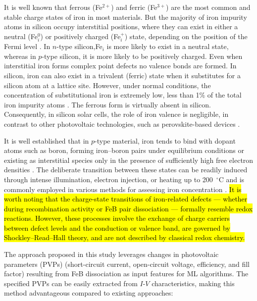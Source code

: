 \documentclass[a4paper,fleqn,draft]{cas-sc}
\begin{document}
\begin{tcolorbox}
\textcolor[rgb]{1.00,0.07,0.00}{
It is well known that ferrous (Fe$^{2+}$) and ferric (Fe$^{3+}$) are the most common and stable charge states of iron in most materials.
But the majority of iron impurity atoms in silicon occupy interstitial positions,
where they can exist in either a neutral (Fe$_i^0$) or positively charged (Fe$_i^+$) state,
depending on the position of the Fermi level \cite{Macdonald2004,Istratov1999}.
In $n$-type silicon,Fe$_i$ is more likely to exist in a neutral state,
whereas in $p$-type silicon, it is more likely to be positively charged.
Even when interstitial iron forms complex point defects no valence bonds are formed.
In silicon, iron can also exist in a trivalent (ferric) state when it substitutes for a silicon atom at a lattice site.
However, under normal conditions, the concentration of substitutional iron is extremely low, less than 1\% of the total iron impurity atoms \cite{Wright2016}.
The ferrous form is virtually absent in silicon.
Consequently, in silicon solar cells, the role of iron valence is negligible,
in contrast to other photovoltaic technologies, such as perovskite-based devices \cite{Poindexter2017}.}%
\end{tcolorbox}

It is well established that in $p$-type material,
iron tends to bind with dopant atoms such as boron, forming iron–boron pairs under equilibrium conditions
or existing as interstitial species only in the presence of sufficiently high free electron densities \cite{Kimerling1983, FeBAssJAP2014}.
The deliberate transition between these states can be readily induced
through intense illumination, electron injection, or heating up to 200~$^\circ$C and
is commonly employed in various methods for assessing iron concentration
\cite{Zoth1990, Rein2, Schmidt2005, Goodarzi2017, Olikh2021JAP, FeMethod2012, Herguth2022, Macdonald2004}.
\textcolor[rgb]{1.00,0.07,0.00}{
\hl{
It is worth noting that the charge-state transitions of iron-related defects ---
whether during recombination activity or FeB pair dissociation --- formally resemble redox reactions.
However, these processes involve the exchange of charge carriers between defect levels and the conduction or valence band,
are governed by Shockley–Read–Hall theory, and are not described by classical redox chemistry.
}}

The approach proposed in this study leverages changes in photovoltaic parameters (PVPs)
(short-circuit current, open-circuit voltage, efficiency, and fill factor) resulting from FeB dissociation as input features for ML algorithms.
The specified PVPs can be easily extracted from $I$-$V$ characteristics, making this method advantageous compared to existing approaches:
\end{document}
